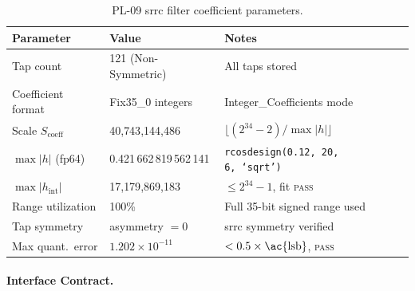 \begin{table}[htbp]
  \caption{PL-09 \ac{srrc} filter coefficient parameters.}
  \label{tab:pl09_coeff}
  \centering
  \small
  \begin{tabular}{lp{4.4cm}p{6.4cm}}
    \hline
    Parameter & Value & Notes \\
    \hline
    Tap count
      & 121 (Non-Symmetric)
      & All taps stored \\[2pt]
    Coefficient format
      & Fix35\_0 integers
      & Integer\_Coefficients mode \\[2pt]
    Scale $S_\text{coeff}$
      & 40{,}743{,}144{,}486
      & $\lfloor(2^{34}-2)/\max|h|\rfloor$
      \\[2pt]
    $\max|h|$ (fp64)
      & 0.421\,662\,819\,562\,141
      & \texttt{rcosdesign(0.12,\,20,\,6,\,`sqrt')}~\cite{ITU_J83} \\[2pt]
    $\max|h_\text{int}|$
      & 17{,}179{,}869{,}183
      & $\leq 2^{34} - 1$, fit \textsc{pass} \\[2pt]
    Range utilization
      & 100\%
      & Full 35-bit signed range used \\[2pt]
    Tap symmetry
      & asymmetry $= 0$
      & \ac{srrc} symmetry verified \\[2pt]
    Max quant.\ error
      & $1.202\times10^{-11}$
      & $< 0.5 \times \text{\ac{lsb}}$, \textsc{pass} \\
    \hline
  \end{tabular}
\end{table}


\FloatBarrier
\paragraph{Interface Contract.}

